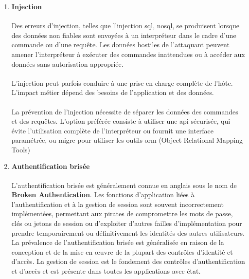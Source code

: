 	  \begin{enumerate}[label=\roman*)]
		\vspace*{0.8cm} \item \textbf{Injection} \vspace*{-0.4cm}
		\paragraph{}
		Des erreurs d'injection, telles que l'injection \gls{sql}, \gls{nosql}, se produisent lorsque des données non fiables sont envoyées à un interpréteur dans le cadre d'une commande ou d'une requête. Les données hostiles de l'attaquant peuvent amener l'interpréteur à exécuter des commandes inattendues ou à accéder aux données sans autorisation appropriée.
		\paragraph{}L'injection peut parfois conduire à une prise en charge complète de l'hôte. L'impact métier dépend des besoins de l'application et des données.
		\paragraph{}La prévention de l'injection nécessite de séparer les données des commandes et des requêtes. L'option préférée consiste à utiliser une \gls{api} sécurisée, qui évite l'utilisation complète de l'interpréteur ou fournit une interface paramétrée, ou migre pour utiliser les outils \gls{orm} (Object Relational Mapping Tools)

		\vspace*{0.8cm} \item \textbf{Authentification brisée} \vspace*{-0.4cm}
		\paragraph{}
		L'authentification brisée est g\'en\'eralement connue en anglais sous le nom de \textbf{Broken Authentication}.
		Les fonctions d'application liées à l'authentification et à la gestion de session sont souvent incorrectement implémentées, permettant aux pirates de compromettre les mots de passe, clés ou jetons de session ou d'exploiter d'autres failles d'implémentation pour prendre temporairement ou définitivement les identités des autres utilisateurs. La prévalence de l'authentification brisée est généralisée en raison de la conception et de la mise en œuvre de la plupart des contrôles d'identité et d'accès. La gestion de session est le fondement des contrôles d'authentification et d'accès et est présente dans toutes les applications avec état.

\end{enumerate}
